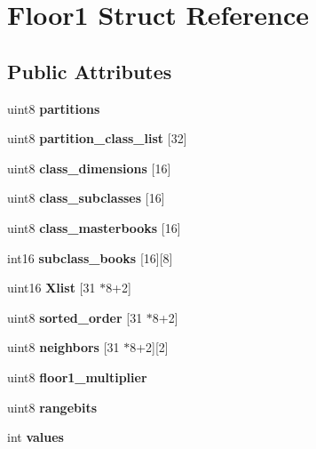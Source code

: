 \hypertarget{struct_floor1}{}\section{Floor1 Struct Reference}
\label{struct_floor1}
\subsection*{Public Attributes}
\begin{DoxyCompactItemize}
\item 
\mbox{\label{struct_floor1_a4dee145bcd73bc21fee38a83ef91a056}} 
uint8 {\bfseries partitions}
\item 
\mbox{\label{struct_floor1_af59d85fae4137a1926954355056f24dc}} 
uint8 {\bfseries partition\+\_\+class\+\_\+list} \mbox{[}32\mbox{]}
\item 
\mbox{\label{struct_floor1_ab7adeb3e2d518eddd510c525e14c0421}} 
uint8 {\bfseries class\+\_\+dimensions} \mbox{[}16\mbox{]}
\item 
\mbox{\label{struct_floor1_af3004149b67bcab60a25afb51ea07f87}} 
uint8 {\bfseries class\+\_\+subclasses} \mbox{[}16\mbox{]}
\item 
\mbox{\label{struct_floor1_ad10936c904d13820156191fcc25c7b07}} 
uint8 {\bfseries class\+\_\+masterbooks} \mbox{[}16\mbox{]}
\item 
\mbox{\label{struct_floor1_af51fdc5e2e82b6357285e2d302b35230}} 
int16 {\bfseries subclass\+\_\+books} \mbox{[}16\mbox{]}\mbox{[}8\mbox{]}
\item 
\mbox{\label{struct_floor1_a2c09f98b7613ec990add2467ea39f240}} 
uint16 {\bfseries Xlist} \mbox{[}31 $\ast$8+2\mbox{]}
\item 
\mbox{\label{struct_floor1_a7e6efe1155cfafd2eeb2cdcc39f121a1}} 
uint8 {\bfseries sorted\+\_\+order} \mbox{[}31 $\ast$8+2\mbox{]}
\item 
\mbox{\label{struct_floor1_a468a990afb1f3735d90992ec66a959d5}} 
uint8 {\bfseries neighbors} \mbox{[}31 $\ast$8+2\mbox{]}\mbox{[}2\mbox{]}
\item 
\mbox{\label{struct_floor1_a38aa153cbf396cc55c05c67489965c73}} 
uint8 {\bfseries floor1\+\_\+multiplier}
\item 
\mbox{\label{struct_floor1_a9edbc16be44c59b3374e7495c300098a}} 
uint8 {\bfseries rangebits}
\item 
\mbox{\label{struct_floor1_a9a426cc6574076ad9e5d969a56af41f4}} 
int {\bfseries values}
\end{DoxyCompactItemize}


